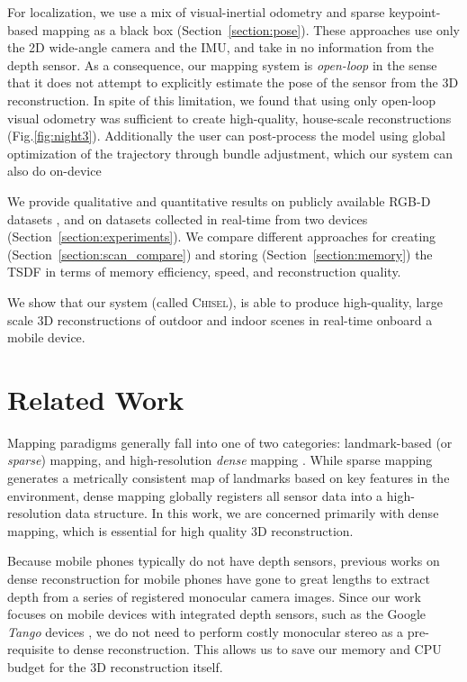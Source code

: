 \documentclass[conference]{IEEEtran}
\newcommand{\sref}[1]{Section~\ref{#1}}
\newcommand{\figref}[1]{Fig.\ref{#1}}
\newcommand{\Tango}{\textit{Tango}\xspace}
\newcommand{\TSDF}{TSDF\xspace}
\newcommand{\chisel}{\textsc{Chisel}\xspace}
\begin{document}
For localization, we use a mix of  visual-inertial odometry \cite{VINS, VINS2}
and sparse keypoint-based mapping \cite{FastSlam} as a black box
(\sref{section:pose}). These approaches use only the 2D wide-angle camera and
the IMU, and take in no information from the depth sensor. As a consequence,
our mapping system  is \textit{open-loop} in the sense that it does not attempt
to explicitly estimate the pose of the sensor from the 3D reconstruction. In spite
of this limitation, we found that using only open-loop visual odometry was
sufficient to create high-quality, house-scale reconstructions
(\figref{fig:night3}). Additionally  the user can post-process the model using
global optimization of the trajectory through bundle adjustment, which our
system can also do on-device

 We provide qualitative and  quantitative results on publicly available RGB-D
 datasets \cite{FREIBURG}, and on datasets collected in real-time from two
 devices (\sref{section:experiments}). We compare different approaches for
 creating (\sref{section:scan_compare}) and storing (\sref{section:memory}) the
 \TSDF in terms of memory efficiency, speed, and reconstruction quality.
 
 We show that our system (called \chisel), is able to produce high-quality,
 large scale 3D reconstructions of outdoor and indoor scenes in real-time
 onboard a mobile device.

\section{Related Work}
Mapping paradigms generally fall into one of two categories: landmark-based (or
\emph{sparse}) mapping, and high-resolution \emph{dense} mapping
\cite{FastSlam}.  While sparse mapping generates a metrically consistent map of
landmarks based on key features in the environment, dense mapping globally
registers all sensor data into a high-resolution data structure. In this work,
we are concerned primarily with dense mapping, which is essential for high
quality 3D reconstruction.

Because mobile phones typically do not have depth sensors, previous works
\cite{TanskanenMetric, DTAM, LSDSlam} on dense reconstruction for mobile phones
have gone to great lengths to extract depth from a series of registered monocular camera
images. Since our work focuses on mobile devices with integrated depth sensors,
such as the Google \Tango devices \cite{Tango}, we do not need to perform
costly monocular stereo as a pre-requisite to dense reconstruction. This allows
us to save our memory and CPU budget for the 3D reconstruction itself.
\end{document}
